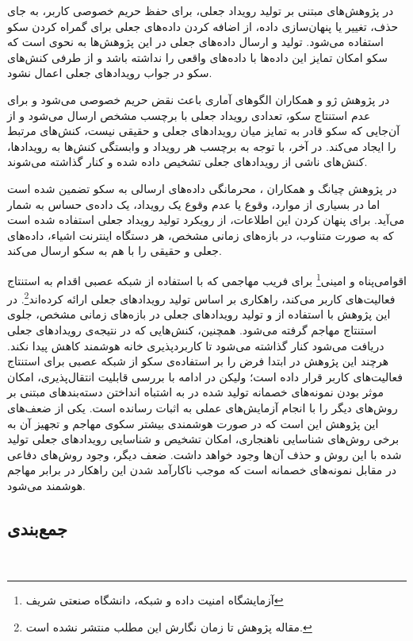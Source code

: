 در پژوهش‌های مبتنی بر تولید رویداد جعلی، برای حفظ حریم خصوصی کاربر، به جای حذف، تغییر یا پنهان‌سازی داده، از اضافه کردن داده‌های جعلی برای گمراه کردن سکو استفاده می‌شود. تولید و ارسال داده‌های جعلی در این پژوهش‌ها به نحوی است که سکو امکان تمایز این داده‌ها با داده‌های واقعی را نداشته باشد و از طرفی کنش‌های سکو در جواب رویدادهای جعلی اعمال نشود.

در پژوهش ژو و همکاران \cite{x3311} الگوهای آماری باعث نقض حریم خصوصی می‌شود و برای عدم استنتاج سکو، تعدادی رویداد جعلی با برچسب مشخص ارسال می‌شود و از آن‌جایی که سکو قادر به تمایز میان رویدادهای جعلی و حقیقی نیست، کنش‌های مرتبط را ایجاد می‌کند. در آخر، با توجه به برچسب هر رویداد و وابستگی کنش‌ها به رویدادها، کنش‌های ناشی از رویدادهای جعلی تشخیص داده شده و کنار گذاشته می‌شوند.

در پژوهش چیانگ و همکاران \cite{x3321}، محرمانگی داده‌های ارسالی به سکو تضمین شده است اما در بسیاری از موارد، وقوع یا عدم وقوع یک رویداد، یک داده‌ی حساس به شمار می‌آید. برای پنهان کردن این اطلاعات، از رویکرد تولید رویداد جعلی استفاده شده است که به صورت متناوب، در بازه‌های زمانی مشخص، هر دستگاه اینترنت اشیاء، داده‌های جعلی و حقیقی را با هم به سکو ارسال می‌کند.

اقوامی‌پناه و امینی\footnote{آزمایشگاه امنیت داده و شبکه، دانشگاه صنعتی شریف} \cite{x3341} برای فریب مهاجمی که با استفاده از شبکه عصبی  اقدام به استنتاج فعالیت‌های کاربر می‌کند، راهکاری بر اساس تولید رویدادهای جعلی ارائه کرده‌اند\footnote{مقاله پژوهش تا زمان نگارش این مطلب منتشر نشده است.}. در این پژوهش با استفاده از  و تولید رویدادهای جعلی در بازه‌های زمانی مشخص، جلوی استنتاج مهاجم گرفته می‌شود. همچنین، کنش‌هایی که در نتیجه‌ی رویدادهای جعلی دریافت می‌شود کنار گذاشته می‌شود تا کاربردپذیری خانه هوشمند کاهش پیدا نکند. هرچند این پژوهش در ابتدا فرض را بر استفاده‌ی سکو از شبکه عصبی  برای استنتاج فعالیت‌های کاربر قرار داده است؛ ولیکن در ادامه با بررسی قابلیت انتقال‌پذیری، امکان موثر بودن نمونه‌های خصمانه تولید شده در به اشتباه انداختن دسته‌بندهای مبتنی بر روش‌های دیگر را با انجام آزمایش‌های عملی به اثبات رسانده است. یکی از ضعف‌های این پژوهش این است که در صورت هوشمندی بیشتر سکوی مهاجم و تجهیز آن به برخی روش‌های شناسایی ناهنجاری، امکان تشخیص و شناسایی رویدادهای جعلی تولید شده با این روش و حذف آن‌ها وجود خواهد داشت. ضعف دیگر، وجود روش‌های دفاعی \cite{x3342} در مقابل نمونه‌های خصمانه است که موجب ناکارآمد شدن این راهکار در برابر مهاجم هوشمند می‌شود.

\subsection{جمع‌بندی}‌

